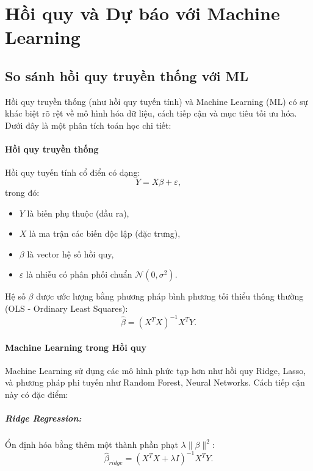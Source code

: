 \chapter{Hồi quy và Dự báo với Machine Learning}
\section{So sánh hồi quy truyền thống với ML}
Hồi quy truyền thống (như hồi quy tuyến tính) và Machine Learning (ML) có sự khác biệt rõ rệt về mô hình hóa dữ liệu, cách tiếp cận và mục tiêu tối ưu hóa. Dưới đây là một phân tích toán học chi tiết:

\subsubsection{Hồi quy truyền thống}
Hồi quy tuyến tính cổ điển có dạng:
\begin{equation}
    Y = X \beta + \varepsilon,
\end{equation}
trong đó:
\begin{itemize}
    \item $Y$ là biến phụ thuộc (đầu ra),
    \item $X$ là ma trận các biến độc lập (đặc trưng),
    \item $\beta$ là vector hệ số hồi quy,
    \item $\varepsilon$ là nhiễu có phân phối chuẩn $\mathcal{N}(0, \sigma^2)$.
\end{itemize}

Hệ số $\beta$ được ước lượng bằng phương pháp bình phương tối thiểu thông thường (OLS - Ordinary Least Squares):
\begin{equation}
    \hat{\beta} = (X^T X)^{-1} X^T Y.
\end{equation}

\subsubsection{Machine Learning trong Hồi quy}
Machine Learning sử dụng các mô hình phức tạp hơn như hồi quy Ridge, Lasso, và phương pháp phi tuyến như Random Forest, Neural Networks. Cách tiếp cận này có đặc điểm:

\paragraph{Ridge Regression:} Ổn định hóa bằng thêm một thành phần phạt $\lambda \|\beta\|^2$:
\begin{equation}
    \hat{\beta}_{ridge} = (X^T X + \lambda I)^{-1} X^T Y.
\end{equation}

